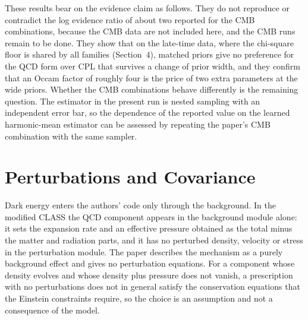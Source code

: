 \documentclass[11pt]{article}
\begin{document}
These results bear on the evidence claim as follows. They do not reproduce or contradict the log evidence ratio of about two reported for the CMB combinations, because the CMB data are not included here, and the CMB runs remain to be done. They show that on the late-time data, where the chi-square floor is shared by all families (Section~4), matched priors give no preference for the QCD form over CPL that survives a change of prior width, and they confirm that an Occam factor of roughly four is the price of two extra parameters at the wide priors. Whether the CMB combinations behave differently is the remaining question. The estimator in the present run is nested sampling with an independent error bar, so the dependence of the reported value on the learned harmonic-mean estimator can be assessed by repeating the paper's CMB combination with the same sampler.

\section{Perturbations and Covariance}

Dark energy enters the authors' code only through the background. In the modified CLASS the QCD component appears in the background module alone: it sets the expansion rate and an effective pressure obtained as the total minus the matter and radiation parts, and it has no perturbed density, velocity or stress in the perturbation module. The paper describes the mechanism as a purely background effect and gives no perturbation equations. For a component whose density evolves and whose density plus pressure does not vanish, a prescription with no perturbations does not in general satisfy the conservation equations that the Einstein constraints require, so the choice is an assumption and not a consequence of the model.
\end{document}
